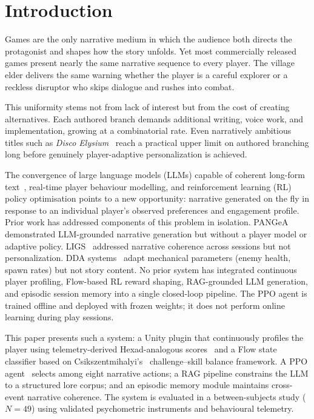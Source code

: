 \documentclass[conference]{IEEEtran}
\begin{document}
\section{Introduction}

Games are the only narrative medium in which the audience both directs the protagonist and shapes how the story unfolds. Yet most commercially released games present nearly the same narrative sequence to every player. The village elder delivers the same warning whether the player is a careful explorer or a reckless disruptor who skips dialogue and rushes into combat.

This uniformity stems not from lack of interest but from the cost of creating alternatives. Each authored branch demands additional writing, voice work, and implementation, growing at a combinatorial rate. Even narratively ambitious titles such as \textit{Disco Elysium}~\cite{discoelysium2019} reach a practical upper limit on authored branching long before genuinely player-adaptive personalization is achieved.

The convergence of large language models (LLMs) capable of coherent long-form text~\cite{brown2020language}, real-time player behaviour modelling, and reinforcement learning (RL) policy optimisation points to a new opportunity: narrative generated on the fly in response to an individual player's observed preferences and engagement profile. Prior work has addressed components of this problem in isolation. PANGeA~\cite{todd2024pangea} demonstrated LLM-grounded narrative generation but without a player model or adaptive policy. LIGS~\cite{ligs2025chi} addressed narrative coherence across sessions but not personalization. DDA systems~\cite{hunicke2004ai, climent2024framework} adapt mechanical parameters (enemy health, spawn rates) but not story content. No prior system has integrated continuous player profiling, Flow-based RL reward shaping, RAG-grounded LLM generation, and episodic session memory into a single closed-loop pipeline. The PPO agent is trained offline and deployed with frozen weights; it does not perform online learning during play sessions.

This paper presents such a system: a Unity plugin that continuously profiles the player using telemetry-derived Hexad-analogous scores~\cite{tondello2016hexad} and a Flow state classifier based on Csikszentmihalyi's~\cite{csikszentmihalyi1990flow} challenge--skill balance framework. A PPO agent~\cite{schulman2017proximal} selects among eight narrative actions; a RAG pipeline constrains the LLM to a structured lore corpus; and an episodic memory module maintains cross-event narrative coherence. The system is evaluated in a between-subjects study ($N = 49$) using validated psychometric instruments and behavioural telemetry.
\end{document}
